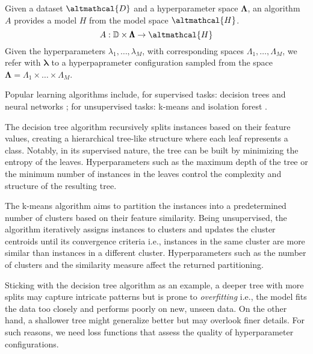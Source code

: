 \documentclass[a4paper,12pt,times,numbered,print,index]{Classes/PhDThesisPSnPDF}
\begin{document}
\begin{definition}\label{def:algorithm}
    Given a dataset $\altmathcal{D}$ and a hyperparameter space $\pmb{\Lambda}$, an algorithm $A$ provides a model $H$ from the model space $\altmathcal{H}$.
    \begin{equation*}\label{eq:algorithm}
        A: \mathbb{D} \times \pmb{\Lambda} \rightarrow \altmathcal{H}
    \end{equation*}
    Given the hyperparameters $\lambda_1, \dots, \lambda_M$, with corresponding spaces $\Lambda_1, \dots, \Lambda_M$, we refer with $\pmb{\lambda}$ to a hyperpaprameter configuration sampled from the space $\pmb{\Lambda} = \Lambda_1 \times \dots \times \Lambda_M$.
\end{definition}

Popular learning algorithms include, for supervised tasks: decision trees \cite{} and neural networks \cite{}; for unsupervised tasks: k-means \cite{} and isolation forest \cite{}.

\begin{example}
    The decision tree algorithm recursively splits instances based on their feature values, creating a hierarchical tree-like structure where each leaf represents a class.
    Notably, in its supervised nature, the tree can be built by minimizing the entropy of the leaves.
    Hyperparameters such as the maximum depth of the tree or the minimum number of instances in the leaves control the complexity and structure of the resulting tree.
\end{example}

\begin{example}[K-Means]
    The k-means algorithm aims to partition the instances into a predetermined number of clusters based on their feature similarity.
    Being unsupervised, the algorithm iteratively assigns instances to clusters and updates the cluster centroids until its convergence criteria i.e., instances in the same cluster are more similar than instances in a different cluster.
    Hyperparameters such as the number of clusters and the similarity measure affect the returned partitioning.
\end{example}

Sticking with the decision tree algorithm as an example, a deeper tree with more splits may capture intricate patterns but is prone to \textit{overfitting} i.e., the model fits the data too closely and performs poorly on new, unseen data.
On the other hand, a shallower tree might generalize better but may overlook finer details.
For such reasons, we need loss functions that assess the quality of hyperparameter configurations.
\end{document}
